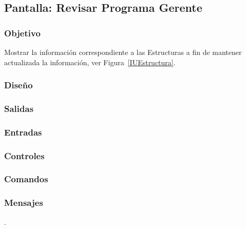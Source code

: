 \subsection{Pantalla: Revisar Programa Gerente}

\subsubsection{Objetivo}
Mostrar la información correspondiente a las Estructuras a fin de mantener actualizada la información, ver Figura~\ref{IUEstructura}. 

\subsubsection{Diseño}

\subsubsection{Salidas}


\subsubsection{Entradas}

\subsubsection{Controles}


\subsubsection{Comandos}


\subsubsection{Mensajes}

.
